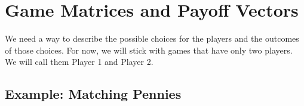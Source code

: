 \section{Game Matrices and Payoff Vectors}


\vspace{.2in}

We need a way to describe the possible choices for the players and the outcomes of those choices.
For now, we will stick with games that have only two players. We will call them Player 1 and Player 2.

\subsection{Example: Matching Pennies}\label{Ex:MatchPennies}


